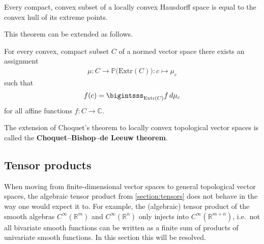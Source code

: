     \begin{theorem}\label{functional:krein_milman}
        Every compact, convex subset of a locally convex Hausdorff space is equal to the convex hull of its extreme points.
    \end{theorem}
    This theorem can be extended as follows.
    \begin{theorem}[Choquet]\label{functional:choquet}
        For every convex, compact subset $C$ of a normed vector space there exists an assignment
        \begin{gather}
            \mu:C\rightarrow\mathbb{P}\big(\mathrm{Extr}(C)\big):c\mapsto\mu_c
        \end{gather}
        such that
        \begin{gather}
            f(c) = \bigintsss_{\mathrm{Extr}(C)}f\,d\mu_c
        \end{gather}
        for all affine functions $f:C\rightarrow\mathbb{C}$.
    \end{theorem}
    \begin{remark}
        The extension of Choquet's theorem to locally convex topological vector spaces is called the \textbf{Choquet--Bishop--de Leeuw theorem}.
    \end{remark}


\subsection{Tensor products}

    When moving from finite-dimensional vector spaces to general topological vector spaces, the algebraic tensor product from \cref{section:tensors} does not behave in the way one would expect it to. For example, the (algebraic) tensor product of the smooth algebras $C^\infty(\mathbb{R}^m)$ and $C^\infty(\mathbb{R}^n)$ only injects into $C^\infty(\mathbb{R}^{m+n})$, i.e.~not all bivariate smooth functions can be written as a finite sum of products of univariate smooth functions. In this section this will be resolved.

